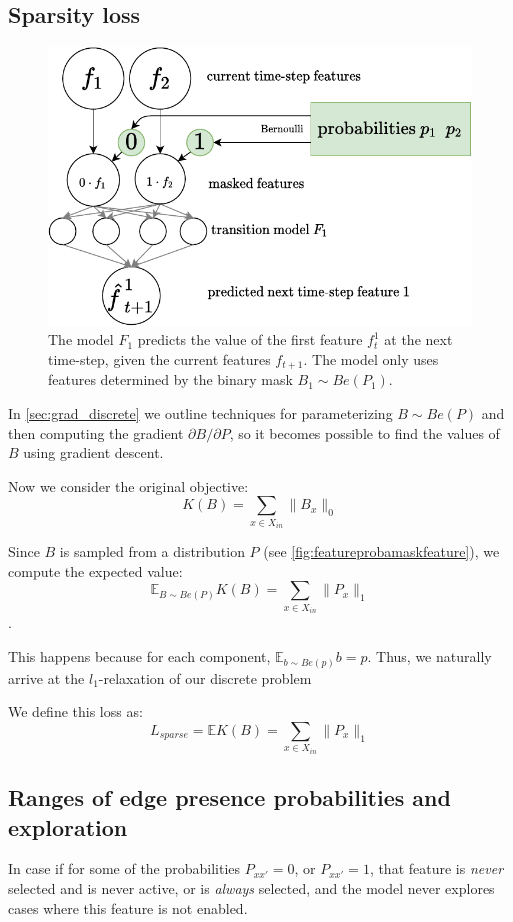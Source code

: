 \documentclass[a4paper,11pt,oneside]{report}
\begin{document}
\subsection{Sparsity loss}
\begin{figure}
    \centering
    \includegraphics[width=0.7\linewidth]{diagrams/feature_proba_mask_feature}
    \caption{The model $F_1$ predicts the value of the first feature $f_t^{1}$ at the next time-step, given the current features $f_{t+1}$. The model only uses features determined by the binary mask $B_1\sim Be(P_1)$.}
    \label{fig:featureprobamaskfeature}
\end{figure}


In \autoref{sec:grad_discrete} we outline techniques for parameterizing $B\sim Be(P)$ and then computing the gradient $\partial B/\partial P$, so it becomes possible to find the values of $B$ using gradient descent.

Now we consider the original objective:
$$
K(B)=\sum\limits_{x\in X_{in}}\|B_x\|_0
$$

Since $B$ is sampled from a distribution $P$ (see \autoref{fig:featureprobamaskfeature}), we compute the expected value:
$$
\mathbb E_{B\sim Be(P)}K(B)=\sum\limits_{x\in X_{in}}\|P_x\|_1
$$.

This happens because for each component, $\mathbb E_{b\sim Be(p)}b=p$. Thus, we naturally arrive at the $l_1$-relaxation of our discrete problem \cite{Bengio2013}

We define this loss as:
$$
L_{sparse}=\mathbb E K(B)=\sum\limits_{x\in X_{in}}\|P_x\|_1
$$

\subsection{Ranges of edge presence probabilities and exploration}
\label{subsec:proba_ranges}
In case if for some of the probabilities $P_{xx'}=0$, or $P_{xx'}=1$, that feature is {\em never} selected and is never active, or is {\em always} selected, and the model never explores cases where this feature is not enabled.
\end{document}

